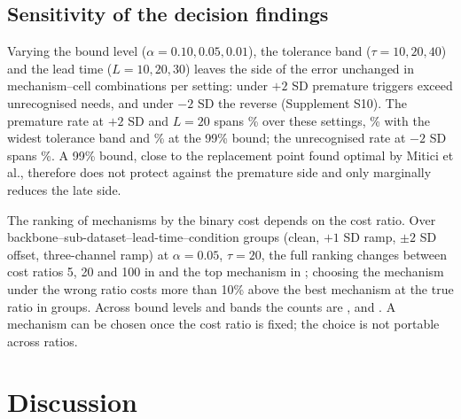 \subsection{Sensitivity of the decision findings}\label{sec:sens}
Varying the bound level ($\alpha=0.10,0.05,0.01$), the tolerance band ($\tau=10,20,40$) and the lead time ($L=10,20,30$) leaves the side of the error unchanged in \RVSensAllOK{} \RVSensDir{} mechanism--cell combinations per setting: under $+2$ SD premature triggers exceed unrecognised needs, and under $-2$ SD the reverse (Supplement S10). The premature rate at $+2$ SD and $L=20$ spans \RVSensPremRange\% over these settings, \RVSensPremTolForty\% with the widest tolerance band and \RVSensPremAlphaOne\% at the 99\% bound; the unrecognised rate at $-2$ SD spans \RVSensLateRange\%. A 99\% bound, close to the replacement point found optimal by Mitici et al.,\cite{mitici2023} therefore does not protect against the premature side and only marginally reduces the late side.

The ranking of mechanisms by the binary cost depends on the cost ratio. Over \RVRankGroups{} backbone--sub-dataset--lead-time--condition groups (clean, $+1$ SD ramp, $\pm2$ SD offset, three-channel ramp) at $\alpha=0.05$, $\tau=20$, the full ranking changes between cost ratios 5, 20 and 100 in \RVRankChg{} and the top mechanism in \RVTopChg; choosing the mechanism under the wrong ratio costs more than 10\% above the best mechanism at the true ratio in \RVRegretTen{} groups. Across bound levels and bands the counts are \RVRankChgRange, \RVTopChgRange{} and \RVRegretTenRange. A mechanism can be chosen once the cost ratio is fixed; the choice is not portable across ratios.

\section{Discussion}
